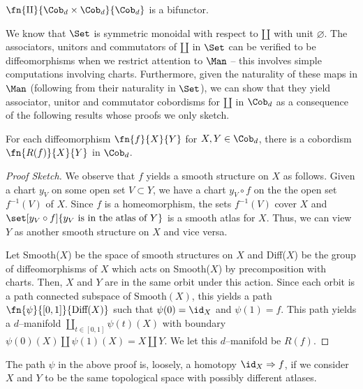 \begin{cor}
$\fn{\amalg}{\Cob_d \times \Cob_d}{\Cob_d}$ is a bifunctor.
\end{cor}

We know that $\Set$ is symmetric monoidal with respect to $\amalg$ with unit
$\varnothing$. The associators, unitors and commutators of $\amalg$ in $\Set$
can be verified to be diffeomorphisms when we restrict attention to $\Man$ --
this involves simple computations involving charts. Furthermore, given the
naturality of these maps in $\Man$ (following from their naturality in $\Set$),
we can show that they yield associator, unitor and commutator cobordisms for
$\amalg$ in $\Cob_d$ as a consequence of the following results \cite{RayanCor1}
whose proofs we only sketch.

\begin{thm}\label{frob:diffcob}
For each diffeomorphism $\fn{f}{X}{Y}$ for $X, Y \in \Cob_d$, there is a
cobordism $\fn{R(f)}{X}{Y}$ in $\Cob_d$.
\end{thm}
\begin{proof}[Proof Sketch]
We observe that $f$ yields a smooth structure on $X$ as follows. Given a chart
$y_V$ on some open set $V \subset Y$, we have a chart $y_V \circ f$ on the
the open set $f^{-1}(V)$ of $X$. Since $f$ is a homeomorphism, the sets
$f^{-1}(V)$ cover $X$ and $\set[y_V \circ f]{y_V \text{ is in the atlas of } Y}$
is a smooth atlas for $X$. Thus, we can view $Y$ as another smooth structure on
$X$ and vice versa.

Let Smooth($X$) be the space of smooth structures on $X$ and Diff($X$) be the
group of diffeomorphisms of $X$ which acts on Smooth($X$) by precomposition with
charts. Then, $X$ and $Y$ are in the same orbit under this action. Since each
orbit is a path connected subspace of $\text{Smooth}(X)$, this yields a path
$\fn{\psi}{[0, 1]}{\text{Diff}(X)}$ such that $\psi(0) = \id_X$ and
$\psi(1) = f$. This path yields a $d$--manifold
$\coprod_{t \in [0, 1]} \psi(t)(X)$ with boundary
$\psi(0)(X) \amalg \psi(1)(X) = X \amalg Y$. We let this $d$--manifold be
$R(f)$.
\end{proof}

\begin{rmk}
The path $\psi$ in the above proof is, loosely, a homotopy
$\id_{X} \Rightarrow f$, if we consider $X$ and $Y$ to be the same topological
space with possibly different atlases.
\end{rmk}

